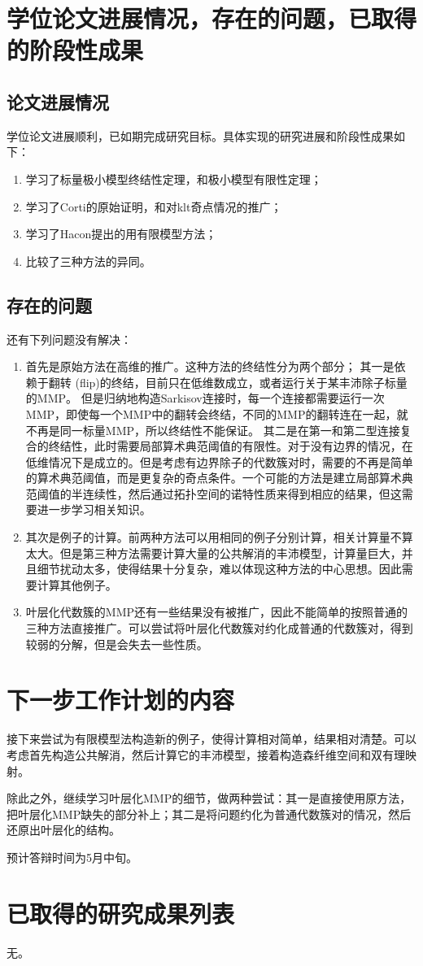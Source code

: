 
\section{学位论文进展情况，存在的问题，已取得的阶段性成果}

\subsection{论文进展情况}
学位论文进展顺利，已如期完成研究目标。具体实现的研究进展和阶段性成果如下：
\begin{enumerate}
  \item 学习了标量极小模型终结性定理，和极小模型有限性定理；
  \item 学习了Corti的原始证明，和对klt奇点情况的推广；
  \item 学习了Hacon提出的用有限模型方法；
  \item 比较了三种方法的异同。
\end{enumerate}
\subsection{存在的问题}
还有下列问题没有解决：
\begin{enumerate}
  \item 首先是原始方法在高维的推广。这种方法的终结性分为两个部分；
    其一是依赖于翻转 (flip)的终结，目前只在低维数成立，或者运行关于某丰沛除子标量的MMP。
    但是归纳地构造Sarkisov连接时，每一个连接都需要运行一次MMP，即使每一个MMP中的翻转会终结，不同的MMP的翻转连在一起，就不再是同一标量MMP，所以终结性不能保证。
    其二是在第一和第二型连接复合的终结性，此时需要局部算术典范阈值的有限性。对于没有边界的情况，在低维情况下是成立的。但是考虑有边界除子的代数簇对时，需要的不再是简单的算术典范阈值，而是更复杂的奇点条件。一个可能的方法是建立局部算术典范阈值的半连续性，然后通过拓扑空间的诺特性质来得到相应的结果，但这需要进一步学习相关知识。
  \item 其次是例子的计算。前两种方法可以用相同的例子分别计算，相关计算量不算太大。但是第三种方法需要计算大量的公共解消的丰沛模型，计算量巨大，并且细节扰动太多，使得结果十分复杂，难以体现这种方法的中心思想。因此需要计算其他例子。
  \item 叶层化代数簇的MMP还有一些结果没有被推广，因此不能简单的按照普通的三种方法直接推广。可以尝试将叶层化代数簇对约化成普通的代数簇对，得到较弱的分解，但是会失去一些性质。
\end{enumerate}
\section{下一步工作计划的内容}
接下来尝试为有限模型法构造新的例子，使得计算相对简单，结果相对清楚。可以考虑首先构造公共解消，然后计算它的丰沛模型，接着构造森纤维空间和双有理映射。

除此之外，继续学习叶层化MMP的细节，做两种尝试：其一是直接使用原方法，把叶层化MMP缺失的部分补上；其二是将问题约化为普通代数簇对的情况，然后还原出叶层化的结构。

预计答辩时间为5月中旬。
\section{已取得的研究成果列表}

无。

